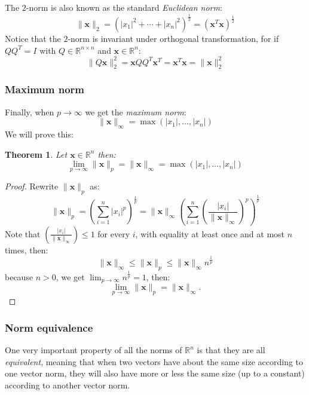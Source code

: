 \documentclass[a4paper,11pt]{report}
\newtheorem{theorem}{Theorem}[section]
\newcommand{\R}{{\mathbb R}}
\begin{document}
The $2$-norm is also known as the standard \emph{Euclidean norm}:
$$\|\mathbf{x}\|_2 = (|x_1|^2+  \cdots + |x_n|^2)^{\frac{1}{2}} = (\mathbf{x}^T \mathbf{x})^{\frac{1}{2}}$$
Notice that the $2$-norm is invariant under orthogonal transformation, for if 
$QQ^T = I$ with $Q \in \R^{n\times n}$ and $\mathbf{x} \in \R^n$:
$$\|Q\mathbf{x}\|^2_2 = \mathbf{x}QQ^T\mathbf{x}^T = \mathbf{x}^T\mathbf{x} = 
\|\mathbf{x}\|^2_2$$

\subsubsection{Maximum norm}
Finally, when $p \to \infty$ we get the \emph{maximum norm}:
$$\|\mathbf{x}\|_\infty = \max(|x_1|, \ldots, |x_n|)$$ 
We will prove this:
\begin{theorem}
  Let $\mathbf{x} \in \R^n$ then:
  $$\lim_{p\to \infty}\|\mathbf{x}\|_p = \|\mathbf{x}\|_\infty =\max(|x_1|, \ldots, |x_n|)$$
\end{theorem}
\begin{proof}
  Rewrite $\|\mathbf{x}\|_p$ as: 
  $$\|\mathbf{x}\|_p = \left(\sum^n_{i=1} |x_i|^p \right)^{\frac{1}{p}} = \|\mathbf{x}\|_\infty 
  \left(\sum^n_{i=1} \left(\frac{|x_i|}{\|\mathbf{x}\|_\infty} \right)^p \right)^{\frac{1}{p}}$$
  Note that $\left(\frac{|x_i|}{\|\mathbf{x}\|_\infty}\right) \leq 1$ for every $i$, with equality at least once and
  at most $n$ times, then:
  $$\|\mathbf{x}\|_\infty \leq \|\mathbf{x}\|_p \leq \|\mathbf{x}\|_\infty n^{\frac{1}{p}}$$ 
  because $n > 0$, we get $\lim_{p\to \infty} n^{\frac{1}{p}} = 1$, then:
  $$\lim_{p\to\infty} \|\mathbf{x}\|_p = \|\mathbf{x}\|_\infty.$$
\end{proof}

\subsubsection{Norm equivalence}

One very important property of all the norms of $\R^n$ is that they are all 
\emph{equivalent}, meaning that when two vectors have about the same size according to one vector norm, they
will also have more or less the same size (up to a constant) according to another vector norm. 
\end{document}
